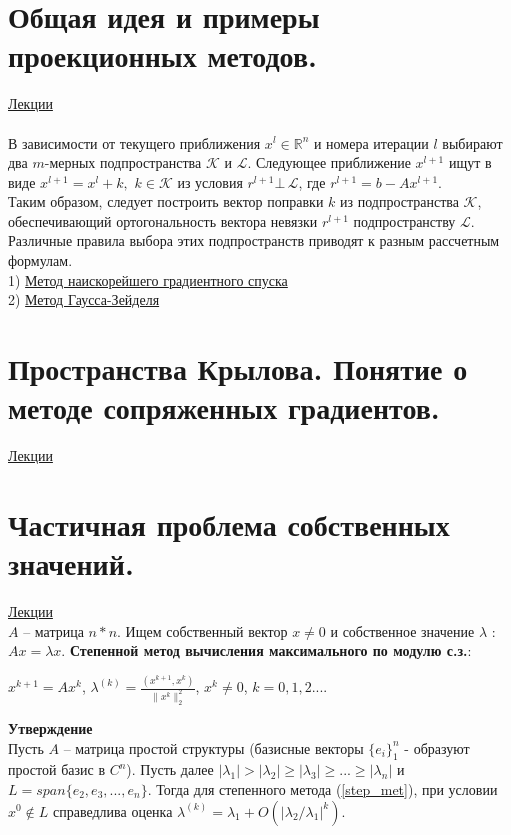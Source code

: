 \documentclass[specialist, subf, href, colorlinks=true, 12pt, times, mtpro, final]{disser}
\theoremstyle{definition}
\begin{document}
\section {Общая идея и примеры проекционных методов.}
	\hyperlink {lects.74}{Лекции}\\
	\\
	В зависимости от текущего приближения $x^l \in \mathds{R}^n$ и номера итерации $l$
	выбирают два $m$-мерных подпространства $\mathcal{K}$ и $\mathcal{L}$. Следующее
	приближение $x^{l+1}$ ищут в виде $x^{l+1} = x^l + k, \,\, k\in \mathcal{K}$ из
	условия $r^{l+1} \bot\, \mathcal{L}$, где $r^{l+1} = b - Ax^{l+1}$.\\
	Таким образом, следует построить вектор поправки $k$ из подпространства $\mathcal{K}$,
	обеспечивающий ортогональность вектора невязки $r^{l+1}$ подпространству $\mathcal{L}$.
	Различные правила выбора этих подпространств приводят к разным рассчетным формулам.
	\\
	1) \hyperlink {lects.74}{Метод наискорейшего градиентного спуска}\\
	2) \hyperlink {lects.74}{Метод Гаусса-Зейделя}

\section {Пространства Крылова. Понятие о методе сопряженных градиентов.}
	\hyperlink {lects.74}{Лекции}\\

\section {Частичная проблема собственных значений.}
	\hyperlink {lects.78}{Лекции}\\
	$A$ \--- матрица $n*n$. Ищем собственный вектор $x \ne 0$ и собственное значение $\lambda$ : $Ax = \lambda x$.
	\textbf{Степенной метод вычисления максимального по модулю с.з.}:\\
	\begin{center}
	\label{step_met}
	$x^{k+1} = Ax^k$,  $\lambda^{(k)} = \frac{(x^{k+1}, x^k)}{\|x^k\|^2_2}$, $x^k \ne 0$,  $k=0,1,2...$.
	\end{center}
	\textbf{Утверждение}\\
	Пусть $A$ \--- матрица простой структуры (базисные векторы $\{e_i\}^n_1$ - образуют простой базис в $C^n$). Пусть далее $|\lambda_1| > |\lambda_2| \geq |\lambda_3| \geq ... \geq |\lambda_n|$ и $L=span\{e_2,e_3,...,e_n\}$. Тогда для степенного метода (\ref{step_met}), при условии $x^0 \notin L$ справедлива оценка $\lambda^{(k)} = \lambda_1 + O(|\lambda_2/\lambda_1|^k)$.
	
\end{document}
